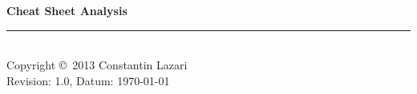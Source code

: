 \documentclass[10pt,landscape]{scrartcl}
\begin{document}
	\raggedright
	\footnotesize
	\begin{multicols}{3}


	\setlength{\premulticols}{1pt}
	\setlength{\postmulticols}{1pt}
	\setlength{\multicolsep}{1pt}
	\setlength{\columnsep}{2pt}
	\newlength{\MyLenA}
	\newlength{\MyLenB}

	\begin{center}
	\Large{\textbf{Cheat Sheet Analysis}} \\
	\end{center}

	

	

	

	

	
		
	

	

	

	

	

	

	

	

	

	


	

	

	

	

	

	


	

	

	
	
	
	

	\rule{0.3\linewidth}{0.25pt}\\
	\scriptsize
	Copyright \copyright\ 2013 Constantin Lazari\\
	Revision: 1.0, Datum: \today\\
	\end{multicols}
\end{document}
